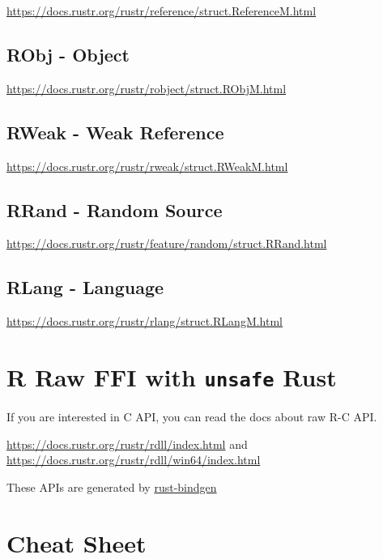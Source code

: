 \documentclass[]{book}
\begin{document}
\url{https://docs.rustr.org/rustr/reference/struct.ReferenceM.html}

\section{RObj - Object}\label{robj---object}

\url{https://docs.rustr.org/rustr/robject/struct.RObjM.html}

\section{RWeak - Weak Reference}\label{rweak---weak-reference}

\url{https://docs.rustr.org/rustr/rweak/struct.RWeakM.html}

\section{RRand - Random Source}\label{rrand---random-source}

\url{https://docs.rustr.org/rustr/feature/random/struct.RRand.html}

\section{RLang - Language}\label{rlang---language}

\url{https://docs.rustr.org/rustr/rlang/struct.RLangM.html}

\chapter{\texorpdfstring{R Raw FFI with \texttt{unsafe}
Rust}{R Raw FFI with unsafe Rust}}\label{r-raw-ffi-with-unsafe-rust}

If you are interested in C API, you can read the docs about raw R-C API.

\url{https://docs.rustr.org/rustr/rdll/index.html} and
\url{https://docs.rustr.org/rustr/rdll/win64/index.html}

These APIs are generated by
\href{https://github.com/crabtw/rust-bindgen}{rust-bindgen}

\chapter{Cheat Sheet}\label{cheat-sheet}


\end{document}
